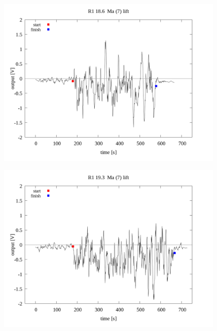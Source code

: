 \documentclass[a4paper]{jsarticle}
\begin{document}
\begin{figure}[htbp]
    \footnotesize
    \begin{center}
        \includegraphics[width=140mm]{../../../../33_result/210806/moving_average/7/lift/02/R1_18.6_ma(7)_lift_02.png}
    \end{center}
\end{figure}

\begin{figure}[htbp]
    \footnotesize
    \begin{center}
        \includegraphics[width=140mm]{../../../../33_result/210806/moving_average/7/lift/02/R1_19.3_ma(7)_lift_02.png}
    \end{center}
\end{figure}
\end{document}
